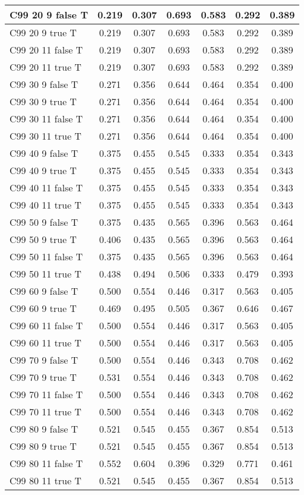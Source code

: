 \documentclass{article}
\begin{document}
\begin{tabular}{|l|c|c|c|c|c|c|}
C99 20  9 false T & 0.219 & 0.307 & 0.693 & 0.583 & 0.292 & 0.389\\ \hline
C99 20  9 true T & 0.219 & 0.307 & 0.693 & 0.583 & 0.292 & 0.389\\ \hline
C99 20 11 false T & 0.219 & 0.307 & 0.693 & 0.583 & 0.292 & 0.389\\ \hline
C99 20 11 true T & 0.219 & 0.307 & 0.693 & 0.583 & 0.292 & 0.389\\ \hline
C99 30  9 false T & 0.271 & 0.356 & 0.644 & 0.464 & 0.354 & 0.400\\ \hline
C99 30  9 true T & 0.271 & 0.356 & 0.644 & 0.464 & 0.354 & 0.400\\ \hline
C99 30 11 false T & 0.271 & 0.356 & 0.644 & 0.464 & 0.354 & 0.400\\ \hline
C99 30 11 true T & 0.271 & 0.356 & 0.644 & 0.464 & 0.354 & 0.400\\ \hline
C99 40  9 false T & 0.375 & 0.455 & 0.545 & 0.333 & 0.354 & 0.343\\ \hline
C99 40  9 true T & 0.375 & 0.455 & 0.545 & 0.333 & 0.354 & 0.343\\ \hline
C99 40 11 false T & 0.375 & 0.455 & 0.545 & 0.333 & 0.354 & 0.343\\ \hline
C99 40 11 true T & 0.375 & 0.455 & 0.545 & 0.333 & 0.354 & 0.343\\ \hline
C99 50  9 false T & 0.375 & 0.435 & 0.565 & 0.396 & 0.563 & 0.464\\ \hline
C99 50  9 true T & 0.406 & 0.435 & 0.565 & 0.396 & 0.563 & 0.464\\ \hline
C99 50 11 false T & 0.375 & 0.435 & 0.565 & 0.396 & 0.563 & 0.464\\ \hline
C99 50 11 true T & 0.438 & 0.494 & 0.506 & 0.333 & 0.479 & 0.393\\ \hline
C99 60  9 false T & 0.500 & 0.554 & 0.446 & 0.317 & 0.563 & 0.405\\ \hline
C99 60  9 true T & 0.469 & 0.495 & 0.505 & 0.367 & 0.646 & 0.467\\ \hline
C99 60 11 false T & 0.500 & 0.554 & 0.446 & 0.317 & 0.563 & 0.405\\ \hline
C99 60 11 true T & 0.500 & 0.554 & 0.446 & 0.317 & 0.563 & 0.405\\ \hline
C99 70  9 false T & 0.500 & 0.554 & 0.446 & 0.343 & 0.708 & 0.462\\ \hline
C99 70  9 true T & 0.531 & 0.554 & 0.446 & 0.343 & 0.708 & 0.462\\ \hline
C99 70 11 false T & 0.500 & 0.554 & 0.446 & 0.343 & 0.708 & 0.462\\ \hline
C99 70 11 true T & 0.500 & 0.554 & 0.446 & 0.343 & 0.708 & 0.462\\ \hline
C99 80  9 false T & 0.521 & 0.545 & 0.455 & 0.367 & 0.854 & 0.513\\ \hline
C99 80  9 true T & 0.521 & 0.545 & 0.455 & 0.367 & 0.854 & 0.513\\ \hline
C99 80 11 false T & 0.552 & 0.604 & 0.396 & 0.329 & 0.771 & 0.461\\ \hline
C99 80 11 true T & 0.521 & 0.545 & 0.455 & 0.367 & 0.854 & 0.513\\ \hline
\end{tabular} 
\end{document}
